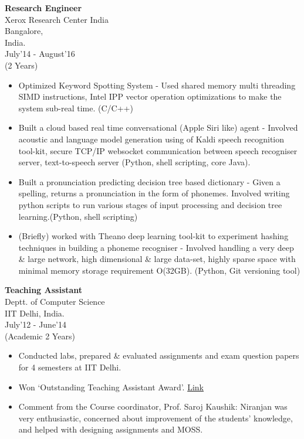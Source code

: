 \documentclass[10pt]{article}
\begin{document}
\parbox{90pt}{\raggedright
	{\bf Research Engineer}\\
	Xerox Research Center India\\
	Bangalore,\\ 
	India.\\
	July'14 - August'16\\
	(2 Years)
}
\parbox{390pt}{
	\begin{itemize}
	\item Optimized Keyword Spotting System - Used shared memory multi threading SIMD instructions, Intel IPP vector operation optimizations to make the system sub-real time. (C/C++)
	\item Built a cloud based real time conversational (Apple Siri like) agent - Involved acoustic and language model generation using of Kaldi speech recognition tool-kit, secure TCP/IP websocket communication between speech recogniser server, text-to-speech server (Python, shell scripting, core Java).
	\item Built a pronunciation predicting decision tree based dictionary - Given a spelling, returns a pronunciation in the form of phonemes. Involved writing python scripts to run various stages of input processing and decision tree learning.(Python, shell scripting)
	\item (Briefly) worked with Theano deep learning tool-kit to experiment hashing techniques in building a phoneme recogniser - Involved handling a very deep \& large network, high dimensional \& large data-set, highly sparse space with minimal memory storage requirement O(32GB). (Python, Git versioning tool)
	\end{itemize}
}
\vspace{10pt}

\parbox{90pt}{\raggedright
	{\bf Teaching Assistant} \\
	Deptt. of Computer Science \\
	IIT Delhi, India. \\
	July'12 - June'14 \\
	(Academic 2 Years)
}
\parbox{390pt}{
	\begin{itemize}
	\item Conducted labs, prepared \& evaluated assignments and exam question papers for 4 semesters at IIT Delhi.
	\item Won `Outstanding Teaching Assistant Award'. \href{http://www.cse.iitd.ac.in/index.php/2011-12-29-23-16-01/teaching-assistant-awards}{Link}
	\item Comment from the Course coordinator, Prof. Saroj Kaushik: Niranjan was very enthusiastic, concerned about improvement of the students' knowledge, and helped with designing assignments and MOSS.
	\end{itemize}		
	
}
\vspace{10pt}
\end{document}
